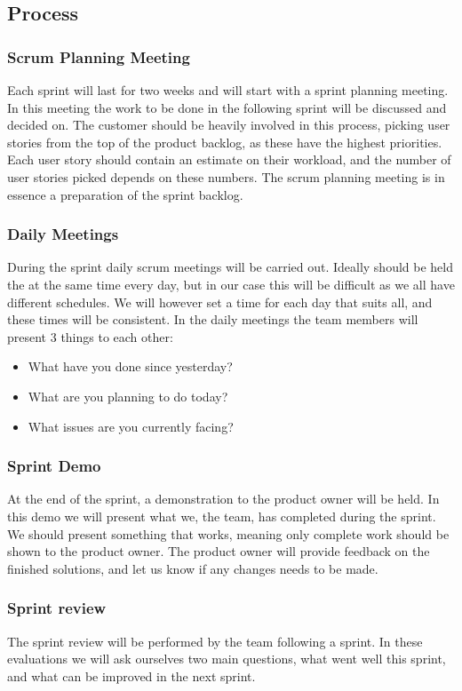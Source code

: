 \subsection{Process}

\subsubsection{Scrum Planning Meeting}
Each sprint will last for two weeks and will start with a sprint planning meeting. In this meeting the work to be done in the following sprint will be discussed and decided on. The customer should be heavily involved in this process, picking user stories from the top of the product backlog, as these have the highest priorities. Each user story should contain an estimate on their workload, and the number of user stories picked depends on these numbers. The scrum planning meeting is in essence a preparation of the sprint backlog.

\subsubsection{Daily Meetings}
During the sprint daily scrum meetings will be carried out. Ideally should be held the at the same time every day, but in our case this will be difficult as we all have different schedules. We will however set a time for each day that suits all, and these times will be consistent. In the daily meetings the team members will present 3 things to each other:
\begin{itemize}
\item What have you done since yesterday?
\item What are you planning to do today?
\item What issues are you currently facing?
\end{itemize}

\subsubsection{Sprint Demo}
At the end of the sprint, a demonstration to the product owner will be held. In this demo we will present what we, the team, has completed during the sprint. We should present something that works, meaning only complete work should be shown to the product owner. The product owner will provide feedback on the finished solutions, and let us know if any changes needs to be made.

\subsubsection{Sprint review}
The sprint review will be performed by the team following a sprint. In these evaluations we will ask ourselves two main questions, what went well this sprint, and what can be improved in the next sprint.


